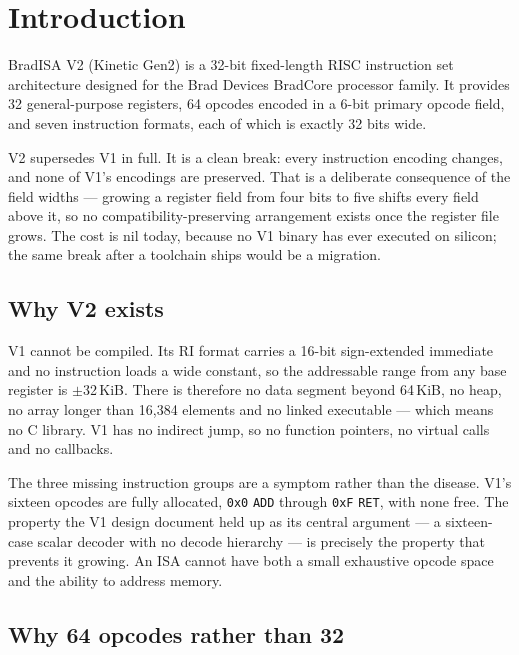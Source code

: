 \documentclass[11pt,a4paper]{article}
\begin{document}
\newpage

\tableofcontents
\newpage

\section{Introduction}

BradISA V2 (Kinetic Gen2) is a 32-bit fixed-length RISC instruction set
architecture designed for the Brad Devices BradCore processor family. It
provides 32 general-purpose registers, 64 opcodes encoded in a 6-bit primary
opcode field, and seven instruction formats, each of which is exactly 32 bits
wide.

V2 supersedes V1 in full. It is a clean break: every instruction encoding
changes, and none of V1's encodings are preserved. That is a deliberate
consequence of the field widths --- growing a register field from four bits to
five shifts every field above it, so no compatibility-preserving arrangement
exists once the register file grows. The cost is nil today, because no V1
binary has ever executed on silicon; the same break after a toolchain ships
would be a migration.

\subsection{Why V2 exists}

V1 cannot be compiled. Its RI format carries a 16-bit sign-extended immediate
and no instruction loads a wide constant, so the addressable range from any base
register is $\pm$32\,KiB. There is therefore no data segment beyond 64\,KiB, no
heap, no array longer than 16,384 elements and no linked executable --- which
means no C library. V1 has no indirect jump, so no function pointers, no
virtual calls and no callbacks.

The three missing instruction groups are a symptom rather than the disease.
V1's sixteen opcodes are fully allocated, \texttt{0x0} \texttt{ADD} through
\texttt{0xF} \texttt{RET}, with none free. The property the V1 design document held
up as its central argument --- a sixteen-case scalar decoder with no decode
hierarchy --- is precisely the property that prevents it growing. An ISA cannot
have both a small exhaustive opcode space and the ability to address memory.

\subsection{Why 64 opcodes rather than 32}
\end{document}
